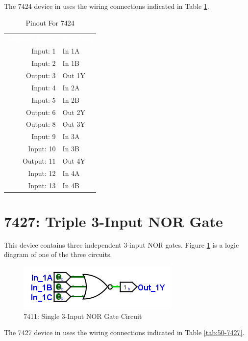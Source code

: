 The 7424 device in \LE uses the wiring connections indicated in Table \ref{tab:50-7424}.

\begin{table}[H]
	\sffamily
	\newcommand{\head}[1]{\textcolor{white}{\textbf{#1}}}		
	\begin{center}
		\begin{tabular}{rl} 
			\rowcolor{black!75}
			\head{Logisim Label} & \head{Function} \\
			Input: 1   & In 1A  \\
			Input: 2   & In 1B  \\
			Output: 3  & Out 1Y \\
			Input: 4   & In 2A  \\
			Input: 5   & In 2B  \\
			Output: 6  & Out 2Y \\
			Output: 8  & Out 3Y \\
			Input: 9   & In 3A  \\
			Input: 10  & In 3B  \\
			Output: 11 & Out 4Y \\
			Input: 12  & In 4A  \\
			Input: 13  & In 4B  \\
		\end{tabular}
	\end{center}
	\caption{Pinout For 7424}
	\label{tab:50-7424}
\end{table}

\section{7427: Triple 3-Input NOR Gate}

This device contains three independent 3-input NOR gates. Figure \ref{fig:app_ttl-7427} is a logic diagram of one of the three circuits.

\begin{figure}[H]
	\centering
	\includegraphics{gfx/app_ttl-7427}
	\caption{7411: Single 3-Input NOR Gate Circuit}
	\label{fig:app_ttl-7427}
\end{figure}

The 7427 device in \LE uses the wiring connections indicated in Table \ref{tab:50-7427}.

